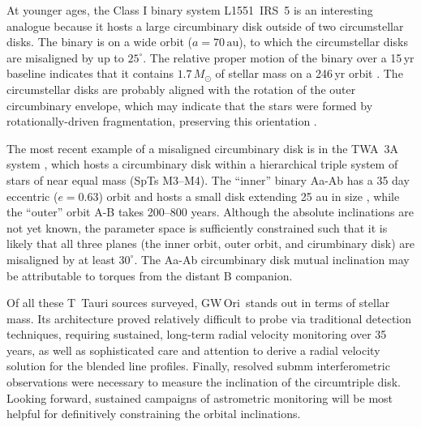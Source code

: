 \documentclass[twocolumn]{aastex61}
\newcommand{\obj}{GW\,Ori}
\begin{document}
At younger ages, the Class I binary system L1551~IRS~5 is an interesting analogue because it hosts a large circumbinary disk \citep[$r\sim500$\,au, $M_\mathrm{disk} \approx 0.07 \,M_\odot$;][]{eisner12,takakuwa17} outside of two circumstellar disks. 
The binary is on a wide orbit ($a = 70\,\mathrm{au}$), to which the circumstellar disks are misaligned by up to $25^\circ$. 
The relative proper motion of the binary over a 15\,yr baseline indicates that it contains $1.7\,M_\odot$ of stellar mass on a 246\,yr orbit \citep{villa17}. 
The circumstellar disks are probably aligned with the rotation of the outer circumbinary envelope, which may indicate that the stars were formed by rotationally-driven fragmentation, preserving this orientation \citep{lim16}. 

The most recent example of a misaligned circumbinary disk is in the TWA~3A system \citep{kellog17}, which hosts a circumbinary disk within a hierarchical triple system of stars of near equal mass (SpTs M3--M4). The ``inner'' binary Aa-Ab has a 35 day eccentric ($e=0.63$) orbit and hosts a small disk extending 25 au in size \citep{andrews10}, while the ``outer'' orbit A-B takes 200--800 years. Although the absolute inclinations are not yet known, the parameter space is sufficiently constrained such that it is likely that all three planes (the inner orbit, outer orbit, and cirumbinary disk) are misaligned by at least $30^\circ$. The Aa-Ab circumbinary disk mutual inclination may be attributable to torques from the distant B companion.

Of all these T~Tauri sources surveyed, \obj\ stands out in terms of stellar mass. Its architecture proved relatively difficult to probe via traditional detection techniques, requiring sustained, long-term radial velocity monitoring over 35 years, as well as sophisticated care and attention to derive a radial velocity solution for the blended line profiles. Finally, resolved submm interferometric observations were necessary to measure the inclination of the circumtriple disk. Looking forward, sustained campaigns of astrometric monitoring will be most helpful for definitively constraining the orbital inclinations.
\end{document}
